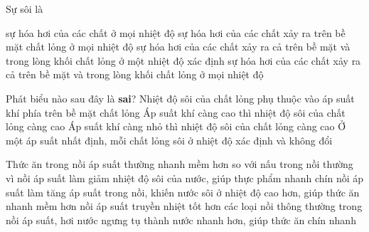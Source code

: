 \begin{ex}
	Sự sôi là
	
	\choice
	{sự hóa hơi của các chất ở mọi nhiệt độ}
	{sự hóa hơi của các chất xảy ra trên bề mặt chất lỏng ở mọi nhiệt độ}
	{\True sự hóa hơi của các chất xảy ra cả trên bề mặt và trong lòng khối chất lỏng ở một nhiệt độ xác định}
	{sự hóa hơi của các chất xảy ra cả trên bề mặt và trong lòng khối chất lỏng ở mọi nhiệt độ}
	\end{ex}
\begin{ex}
	Phát biểu nào sau đây là \textbf{sai}?
	\choice
	{Nhiệt độ sôi của chất lỏng phụ thuộc vào áp suất khí phía trên bề mặt chất lỏng}
	{Áp suất khí càng cao thì nhiệt độ sôi của chất lỏng càng cao}
	{\True Áp suất khí càng nhỏ thì nhiệt độ sôi của chất lỏng càng cao}
	{Ở một áp suất nhất định, mỗi chất lỏng sôi ở nhiệt độ xác định và không đổi}
	\end{ex}
\begin{ex} 
	Thức ăn trong nồi áp suất thường nhanh mềm hơn so với nấu trong nồi thường vì
	\choice
	{nồi áp suất làm giảm nhiệt độ sôi của nước, giúp thực phẩm nhanh chín}
	{\True nồi áp suất làm tăng áp suất trong nồi, khiến nước sôi ở nhiệt độ cao hơn, giúp thức ăn nhanh mềm hơn}
	{nồi áp suất truyền nhiệt tốt hơn các loại nồi thông thường}
	{trong nồi áp suất, hơi nước ngưng tụ thành nước nhanh hơn, giúp thức ăn chín nhanh}
\end{ex}
